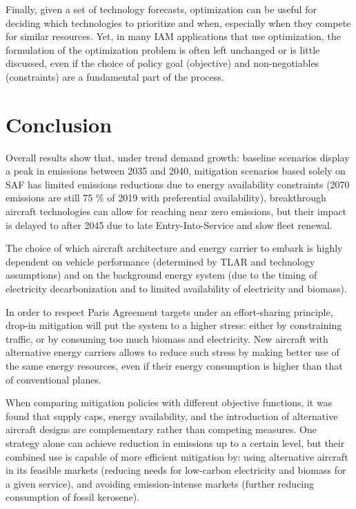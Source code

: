 \documentclass[a4paper,fleqn]{cas-dc}
\begin{document}
Finally, given a set of technology forecasts, optimization can be useful for deciding which technologies to prioritize and when, especially when they compete for similar resources. Yet, in many IAM applications that use optimization, the formulation of the optimization problem is often left unchanged or is little discussed, even if the choice of policy goal (objective) and non-negotiables (constraints) are a fundamental part of the process.

\section{Conclusion}
\label{sec:conclus}

Overall results show that, under trend demand growth: baseline scenarios display a peak in emissions between 2035 and 2040, mitigation scenarios based solely on SAF has limited emissions reductions due to energy availability constraints (2070 emissions are still 75 \% of 2019 with preferential availability), breakthrough aircraft technologies can allow for reaching near zero emissions, but their impact is delayed to after 2045 due to late Entry-Into-Service and slow fleet renewal.

The choice of which aircraft architecture and energy carrier to embark is highly dependent on vehicle performance (determined by TLAR and technology assumptions) and on the background energy system (due to the timing of electricity decarbonization and to limited availability of electricity and biomass).

In order to respect Paris Agreement targets under an effort-sharing principle, drop-in mitigation will put the system to a higher stress: either by constraining traffic, or by consuming too much biomass and electricity. New aircraft with alternative energy carriers allows to reduce such stress by making better use of the same energy resources, even if their energy consumption is higher than that of conventional planes.

When comparing mitigation policies with different objective functions, it was found that supply caps, energy availability, and the introduction of alternative aircraft designs are complementary rather than competing measures. One strategy alone can achieve reduction in emissions up to a certain level, but their combined use is capable of more efficient mitigation by: using alternative aircraft in its feasible markets (reducing needs for low-carbon electricity and biomass for a given service), and avoiding emission-intense markets (further reducing consumption of fossil kerosene).
\end{document}

